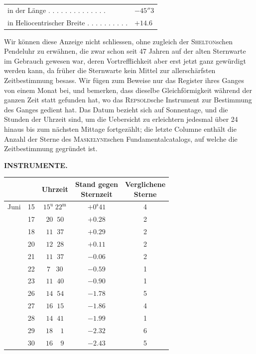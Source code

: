 \begin{center}
\begin{tabular}{ll}
in der Länge . . . . . . . . . . . . . . & $-45''3$ \\
in Heliocentrischer Breite . . . . . . . . . . & $+14.6$ \\
\end{tabular}
\end{center}

\par\indent Wir können diese Anzeige nicht schliessen, ohne zugleich der \textsc{Shelton}schen Pendeluhr zu erwähnen, die zwar schon seit 47 Jahren auf der alten Sternwarte im Gebrauch gewesen war, deren Vortrefflichkeit aber erst jetzt ganz gewürdigt werden kann, da früher die Sternwarte kein Mittel zur allerschärfsten Zeitbestimmung besass. Wir fügen zum Beweise nur das Register ihres Ganges von einem Monat bei, und bemerken, dass dieselbe Gleichförmigkeit während der ganzen Zeit statt gefunden hat, wo das \textsc{Repsold}sche Instrument zur Bestimmung des Ganges gedient hat. Das Datum bezieht sich auf Sonnentage, und die Stunden der Uhrzeit sind, um die Uebersicht zu erleichtern jedesmal über 24 hinaus bis zum nächsten Mittage fortgezählt; die letzte Columne enthält die Anzahl der Sterne des \textsc{Maskelyne}schen Fundamentalcatalogs, auf welche die Zeitbestimmung gegründet ist.

\clearpage
\noindent{}%
%
\parbox[t]{\dimexpr\linewidth-24mm\relax}{\centering\footnotesize\bfseries INSTRUMENTE.\par}%
\makebox[12mm][r]{}\par\nobreak\medskip
\begin{center}
\begin{tabular}{ll|c|c|c}
 & & Uhrzeit & \shortstack{Stand gegen\\Sternzeit} & \shortstack{Verglichene\\Sterne} \\
\hline
Juni & 15 & $15^{\mathrm u}\;22^{\mathrm m}$ & $+0^{\mathrm s}41$ & 4 \\
 & 17 & $20\;\;50$ & $+0.28$ & 2 \\
 & 18 & $11\;\;37$ & $+0.29$ & 2 \\
 & 20 & $12\;\;28$ & $+0.11$ & 2 \\
 & 21 & $11\;\;37$ & $-0.06$ & 2 \\
 & 22 & $7\;\;\;30$ & $-0.59$ & 1 \\
 & 23 & $11\;\;40$ & $-0.90$ & 1 \\
 & 26 & $14\;\;54$ & $-1.78$ & 5 \\
 & 27 & $16\;\;15$ & $-1.86$ & 4 \\
 & 28 & $14\;\;41$ & $-1.99$ & 1 \\
 & 29 & $18\;\;\;\;1$ & $-2.32$ & 6 \\
 & 30 & $16\;\;\;\;9$ & $-2.43$ & 5 \\
\end{tabular}
\end{center}

